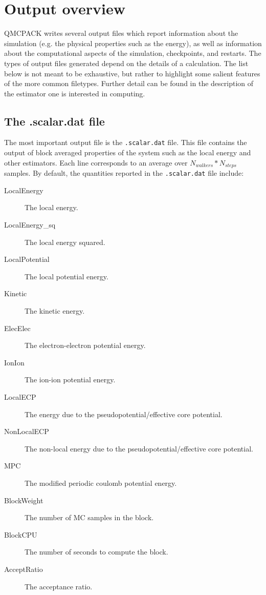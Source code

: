 \chapter{Output overview}
\label{chap:output_overview}

QMCPACK writes several output files which report information about the simulation (e.g. the physical properties such as the energy), as well as information about the computational aspects of the simulation, checkpoints, and restarts.
The types of output files generated depend on the details of a calculation. The list below is not meant to be exhaustive, but rather to highlight some salient features of the more common filetypes. Further detail can be found in the description of the estimator one is interested in computing.


\section{The .scalar.dat file}
\label{sec:scalardat_file}
The most important output file is the \texttt{.scalar.dat} file. This file contains the output of block averaged properties of the system such as the local energy and other estimators.
Each line corresponds to an average over $N_{walkers}*N_{steps}$ samples.
By default, the quantities reported in the \texttt{.scalar.dat} file include:

\begin{description}
\item[LocalEnergy] The local energy.
\item[LocalEnergy\_sq] The local energy squared.
\item[LocalPotential] The local potential energy.
\item[Kinetic] The kinetic energy.
\item[ElecElec] The electron-electron potential energy.
\item[IonIon] The ion-ion potential energy.
\item[LocalECP] The energy due to the pseudopotential/effective core potential.
\item[NonLocalECP] The non-local energy due to the pseudopotential/effective core potential.
\item[MPC] The modified periodic coulomb potential energy.
\item[BlockWeight] The number of MC samples in the block.
\item[BlockCPU] The number of seconds to compute the block.
\item[AcceptRatio] The acceptance ratio.
\end{description}

